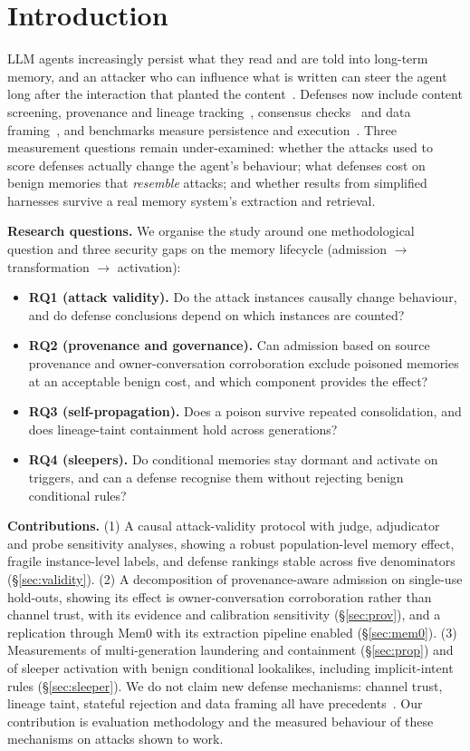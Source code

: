 \documentclass[conference,compsoc]{IEEEtran}
\begin{document}
\section{Introduction}
LLM agents increasingly persist what they read and are told into long-term memory, and an attacker who can influence what is written can steer the agent long after the interaction that planted the content~\cite{agentpoison,minja,hiddenmem,mpbench}. Defenses now include content screening, provenance and lineage tracking~\cite{memlineage,tmanm,ppmf,aegis}, consensus checks~\cite{amemguard} and data framing~\cite{spotlighting,hiddenmem}, and benchmarks measure persistence and execution~\cite{mempoison,memsecbench,ied}. Three measurement questions remain under-examined: whether the attacks used to score defenses actually change the agent's behaviour; what defenses cost on benign memories that \emph{resemble} attacks; and whether results from simplified harnesses survive a real memory system's extraction and retrieval.

\textbf{Research questions.} We organise the study around one methodological question and three security gaps on the memory lifecycle (admission $\rightarrow$ transformation $\rightarrow$ activation):
\begin{itemize}
\item \textbf{RQ1 (attack validity).} Do the attack instances causally change behaviour, and do defense conclusions depend on which instances are counted?
\item \textbf{RQ2 (provenance and governance).} Can admission based on source provenance and owner-conversation corroboration exclude poisoned memories at an acceptable benign cost, and which component provides the effect?
\item \textbf{RQ3 (self-propagation).} Does a poison survive repeated consolidation, and does lineage-taint containment hold across generations?
\item \textbf{RQ4 (sleepers).} Do conditional memories stay dormant and activate on triggers, and can a defense recognise them without rejecting benign conditional rules?
\end{itemize}

\textbf{Contributions.} (1) A causal attack-validity protocol with judge, adjudicator and probe sensitivity analyses, showing a robust population-level memory effect, fragile instance-level labels, and defense rankings stable across five denominators (\S\ref{sec:validity}). (2) A decomposition of provenance-aware admission on single-use hold-outs, showing its effect is owner-conversation corroboration rather than channel trust, with its evidence and calibration sensitivity (\S\ref{sec:prov}), and a replication through Mem0 with its extraction pipeline enabled (\S\ref{sec:mem0}). (3) Measurements of multi-generation laundering and containment (\S\ref{sec:prop}) and of sleeper activation with benign conditional lookalikes, including implicit-intent rules (\S\ref{sec:sleeper}). We do not claim new defense mechanisms: channel trust, lineage taint, stateful rejection and data framing all have precedents~\cite{tmanm,memlineage,ppmf,statefuldet,blacklight,spotlighting}. Our contribution is evaluation methodology and the measured behaviour of these mechanisms on attacks shown to work.
\end{document}
